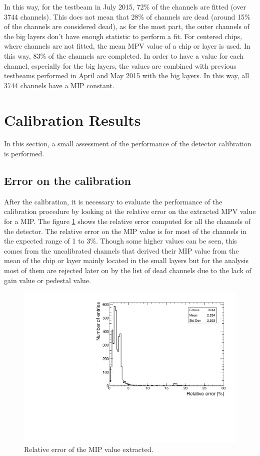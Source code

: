 In this way, for the testbeam in July 2015, 72\% of the channels are fitted (over 3744 channels). This does not mean that 28\% of channels are dead (around 15\% of the channels are considered dead), as for the most part, the outer channels of the big layers don't have enough statistic to perform a fit. For centered chips, where channels are not fitted, the mean MPV value of a chip or layer is used. In this way, 83\% of the channels are completed. In order to have a value for each channel, especially for the big layers, the values are combined with previous testbeams performed in April and May 2015 with the big layers. In this way, all 3744 channels have a MIP constant.

\section{Calibration Results}

In this section, a small assessment of the performance of the detector calibration is performed.

\subsection{Error on the calibration}

After the calibration, it is necessary to evaluate the performance of the calibration procedure by looking at the relative error on the extracted MPV value for a MIP. The figure \ref{fig:MIPError} shows the relative error computed for all the channels of the detector. The relative error on the MIP value is for most of the channels in the expected range of 1 to 3\%. Though some higher values can be seen, this comes from the uncalibrated channels that derived their MIP value from the mean of the chip or layer mainly located in the small layers but for the analysis most of them are rejected later on by the list of dead channels due to the lack of gain value or pedestal value.

\begin{figure}[htbp!]
	\centering
	\includegraphics[width=0.7\linewidth]{chap5/fig_EnergyCalib/RelativeErrorMIP_Combined.pdf}
	\caption{Relative error of the MIP value extracted.} \label{fig:MIPError}
\end{figure}

